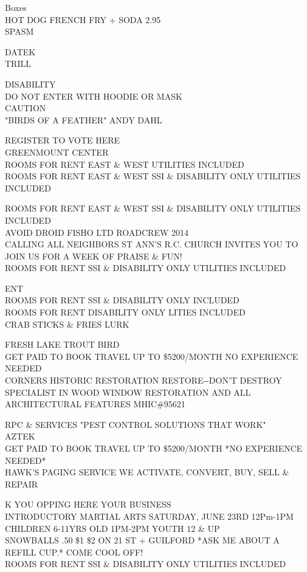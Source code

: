 \documentclass[10pt,letterpaper]{article}
\begin{document}
Boxes\\
HOT DOG FRENCH FRY + SODA 2.95\\
SPASM

DATEK\\
TRILL

DISABILITY\\
DO NOT ENTER WITH HOODIE OR MASK\\
CAUTION\\
"BIRDS OF A FEATHER" ANDY DAHL

REGISTER TO VOTE HERE\\
GREENMOUNT CENTER\\
ROOMS FOR RENT EAST \& WEST UTILITIES INCLUDED\\
ROOMS FOR RENT EAST \& WEST SSI \& DISABILITY ONLY UTILITIES INCLUDED

ROOMS FOR RENT EAST \& WEST SSI \& DISABILITY ONLY UTILITIES INCLUDED\\
AVOID DROID FISHO LTD ROADCREW 2014\\
CALLING ALL NEIGHBORS ST ANN'S R.C. CHURCH INVITES YOU TO JOIN US FOR A WEEK OF PRAISE \& FUN!\\
ROOMS FOR RENT SSI \& DISABILITY ONLY UTILITIES INCLUDED

ENT\\
ROOMS FOR RENT SSI \& DISABILITY ONLY INCLUDED\\
ROOMS FOR RENT DISABILITY ONLY LITIES INCLUDED\\
CRAB STICKS \& FRIES LURK

FRESH LAKE TROUT BIRD\\
GET PAID TO BOOK TRAVEL UP TO \$5200/MONTH NO EXPERIENCE NEEDED\\
CORNERS HISTORIC RESTORATION RESTORE{-}{-}DON'T DESTROY SPECIALIST IN WOOD WINDOW RESTORATION AND ALL ARCHITECTURAL FEATURES MHIC\#95621

RPC \& SERVICES "PEST CONTROL SOLUTIONS THAT WORK"\\
AZTEK\\
GET PAID TO BOOK TRAVEL UP TO \$5200/MONTH *NO EXPERIENCE NEEDED*\\
HAWK'S PAGING SERVICE WE ACTIVATE, CONVERT, BUY, SELL \& REPAIR

K YOU OPPING HERE YOUR BUSINESS\\
INTRODUCTORY MARTIAL ARTS SATURDAY, JUNE 23RD 12Pm{-}1PM CHILDREN 6{-}11YRS OLD 1PM{-}2PM YOUTH 12 \& UP\\
SNOWBALLS .50 \$1 \$2 ON 21 ST + GUILFORD *ASK ME ABOUT A REFILL CUP.* COME COOL OFF!\\
ROOMS FOR RENT SSI \& DISABILITY ONLY UTILITIES INCLUDED
\end{document}
